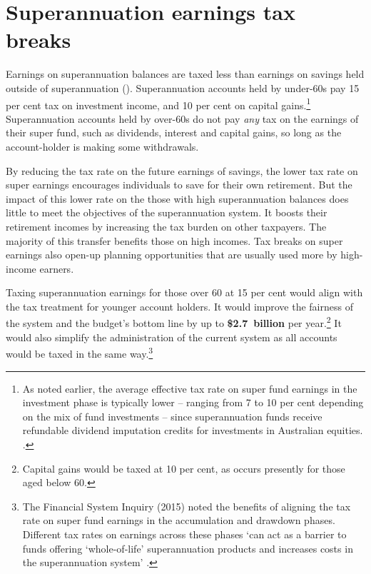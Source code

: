 \documentclass{grattanAlpha}
\begin{document}
\chapter{Superannuation earnings tax breaks}\label{chapter:SUPER-6}
Earnings on superannuation balances are taxed less than earnings on savings held outside of superannuation (). Superannuation accounts held by under-60s pay 15 per cent tax on investment income, and 10 per cent on capital gains.\footnote{As noted earlier, the average effective tax rate on super fund earnings in the investment phase is typically lower -- ranging from 7 to 10 per cent depending on the mix of fund investments -- since superannuation funds receive refundable dividend imputation credits for investments in Australian equities.  \textcite[][7]{Mercer2013}.}  Superannuation accounts held by over-60s do not pay \emph{any} tax on the earnings of their super fund, such as dividends, interest and capital gains, so long as the account-holder is making some withdrawals.

By reducing the tax rate on the future earnings of savings, the lower tax rate on super earnings encourages individuals to save for their own retirement. But the impact of this lower rate on the those with high superannuation balances does little to meet the objectives of the superannuation system. It boosts their retirement incomes by increasing the tax burden on other taxpayers. The majority of this transfer benefits those on high incomes. Tax breaks on super earnings also open-up planning opportunities that are usually used more by high-income earners.

Taxing superannuation earnings for those over 60 at 15 per cent would align with the tax treatment for younger account holders. It would improve the fairness of the system and the budget’s bottom line by up to \textbf{\$2.7~billion} per year.\footnote{Capital gains would be taxed at 10 per cent, as occurs presently for those aged below 60.}  It would also simplify the administration of the current system as all accounts would be taxed in the same way.\footnote{The \textcite[][140]{FinancialSystemsInquiry2015} Financial System Inquiry (2015) noted the benefits of aligning the tax rate on super fund earnings in the accumulation and drawdown phases. Different tax rates on earnings across these phases ‘can act as a barrier to funds offering ‘whole-of-life’ superannuation products and increases costs in the superannuation system’ \textcite[][140]{FinancialSystemsInquiry2015}. } 
\end{document}
